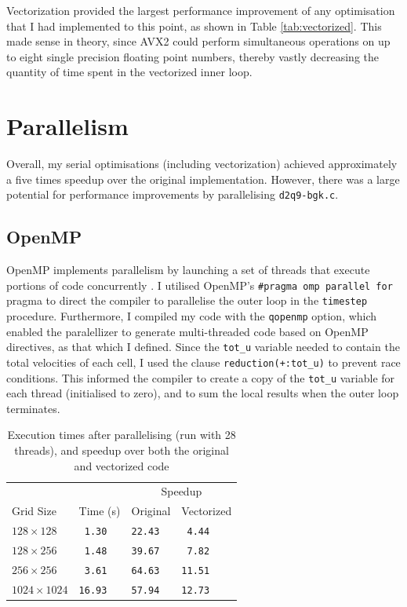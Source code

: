 \documentclass[11pt, twocolumn, a4paper]{article}
\begin{document}
Vectorization provided the largest performance improvement of any optimisation that I had implemented to this point, as shown in Table \ref{tab:vectorized}.
This made sense in theory, since AVX2 could perform simultaneous operations on up to eight single precision floating point numbers, thereby vastly decreasing the quantity of time spent in the vectorized inner loop.

\section{Parallelism}

Overall, my serial optimisations (including vectorization) achieved approximately a five times speedup over the original implementation.
However, there was a large potential for performance improvements by parallelising \texttt{d2q9-bgk.c}. 

\subsection{OpenMP}

OpenMP implements parallelism by launching a set of threads that execute portions of code concurrently \cite{openmp_cornell}.
I utilised OpenMP's \texttt{\#pragma omp parallel for} pragma to direct the compiler to parallelise the outer loop in the \texttt{timestep} procedure.
Furthermore, I compiled my code with the \texttt{qopenmp} option, which enabled the paralellizer to generate multi-threaded code based on OpenMP directives, as that which I defined.
Since the \texttt{tot\_u} variable needed to contain the total velocities of each cell, I used the clause \texttt{reduction(+:tot\_u)} to prevent race conditions.
This informed the compiler to create a copy of the \texttt{tot\_u} variable for each thread (initialised to zero), and to sum the local results when the outer loop terminates.

\begin{table}[htbp]
  \begin{center}
  \caption{Execution times after parallelising (run with 28 threads), and speedup over both the original and vectorized code}\label{tab:parallelised}
  \begin{tabular}{l | l  l  l} 
      \hline\hline
      &&\multicolumn{2}{c}{Speedup}\\
      \cline{3-4}
      Grid Size&Time (s)&Original&Vectorized\\
      \hline
      $128 \times 128$&\texttt{ 1.30}&\texttt{22.43}&\texttt{ 4.44}\\
      $128 \times 256$&\texttt{ 1.48}&\texttt{39.67}&\texttt{ 7.82}\\
      $256 \times 256$&\texttt{ 3.61}&\texttt{64.63}&\texttt{11.51}\\
      $1024 \times 1024$&\texttt{16.93}&\texttt{57.94}&\texttt{12.73}\\
      \hline
    \end{tabular}
  \end{center}
\end{table}
\end{document}
